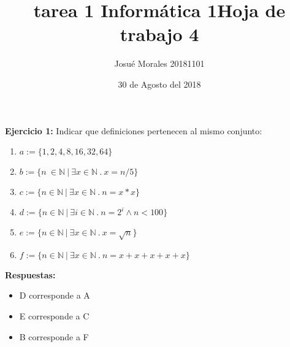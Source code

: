 \documentclass[10pt,a4paper]{article}
\author{Josué Morales 20181101}
\title{tarea 1 Informática 1}
\date{30 de Agosto del 2018}
\begin{document}
 \title{\bf Hoja de trabajo 4}
 \maketitle
{\bf Ejercicio 1:}
Indicar que definiciones pertenecen al mismo conjunto:

\begin{enumerate}
	\item{$a:=\{1,2,4,8,16,32,64\}$}
	\item{$b:=\{n\ \in \mathbb{N}\ |\ \exists x \in \mathbb{N}\ .\ x=n/5 \}$}
	\item{$c:=\{n\in \mathbb{N}\ |\ \exists x\in\mathbb{N}\ .\ n=x*x \}$}
	\item{$d:=\{n\in\mathbb{N}\ |\ \exists i\in\mathbb{N}\ .\ n=2^i\wedge n<100 \}$}
	\item{$e:=\{ n\in\mathbb{N}\ |\ \exists x\in \mathbb{N}\ .\ x=\sqrt{n} \}$}
	\item{$f:=\{ n\in\mathbb{N}\ |\ \exists x\in \mathbb{N}\ .\ n=x+x+x+x+x \}$}
\end{enumerate}

{\bf Respuestas:}
\begin{itemize}
	\item D corresponde a A
	\item E corresponde a C
	\item B corresponde a F 
\end{itemize}
  
 \
 
\end{document}
